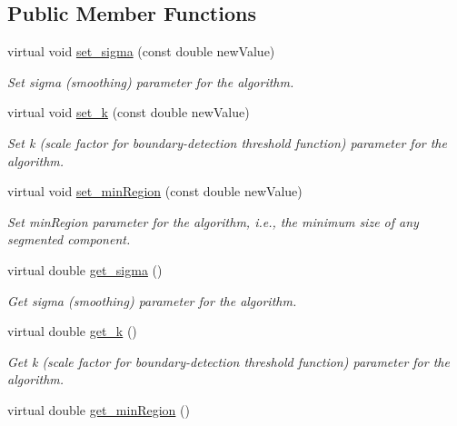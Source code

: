 \subsection*{Public Member Functions}
\begin{DoxyCompactItemize}
\item 
virtual void \hyperlink{classyarp_1_1sig_1_1SegmentationModuleInterface_a68f28930df5e930934c0ee56ad1f680c}{set\+\_\+sigma} (const double new\+Value)
\begin{DoxyCompactList}\small\item\em Set sigma (smoothing) parameter for the algorithm. \end{DoxyCompactList}\item 
virtual void \hyperlink{classyarp_1_1sig_1_1SegmentationModuleInterface_a2851eae0226ad68f41cd8b61d8bb1456}{set\+\_\+k} (const double new\+Value)
\begin{DoxyCompactList}\small\item\em Set k (scale factor for boundary-\/detection threshold function) parameter for the algorithm. \end{DoxyCompactList}\item 
virtual void \hyperlink{classyarp_1_1sig_1_1SegmentationModuleInterface_ad9d90ed7e362ae83e2145445a9c4301e}{set\+\_\+min\+Region} (const double new\+Value)
\begin{DoxyCompactList}\small\item\em Set min\+Region parameter for the algorithm, i.\+e., the minimum size of any segmented component. \end{DoxyCompactList}\item 
virtual double \hyperlink{classyarp_1_1sig_1_1SegmentationModuleInterface_a38431f2c63d7da8ebf20adf0ed1da4fe}{get\+\_\+sigma} ()
\begin{DoxyCompactList}\small\item\em Get sigma (smoothing) parameter for the algorithm. \end{DoxyCompactList}\item 
virtual double \hyperlink{classyarp_1_1sig_1_1SegmentationModuleInterface_a91f3d872a48599337d1d2f365ac4c31e}{get\+\_\+k} ()
\begin{DoxyCompactList}\small\item\em Get k (scale factor for boundary-\/detection threshold function) parameter for the algorithm. \end{DoxyCompactList}\item 
virtual double \hyperlink{classyarp_1_1sig_1_1SegmentationModuleInterface_a6c184aeea894f6afcc342c5aa748429d}{get\+\_\+min\+Region} ()

\end{DoxyCompactItemize}
